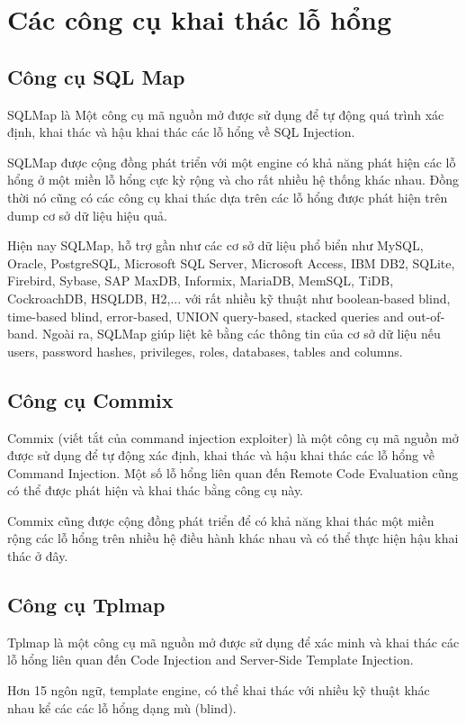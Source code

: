 \documentclass[./../main.tex]{subfiles}
\begin{document}
\section{Các công cụ khai thác lỗ hổng}

\subsection{Công cụ SQL Map}
SQLMap là Một công cụ mã nguồn mở được sử dụng để tự động quá trình xác
định, khai thác và hậu khai thác các lỗ hổng về SQL Injection.

SQLMap được cộng đồng phát triển với một engine có khả năng phát hiện các
lỗ hổng ở một miền lỗ hổng cực kỳ rộng và cho rất nhiều hệ thống khác nhau.
Đồng thời nó cũng có các công cụ khai thác dựa trên các lỗ hổng được phát
hiện trên dump cơ sở dữ liệu hiệu quả.

Hiện nay SQLMap, hỗ trợ gần như các cơ sở dữ liệu phổ biển như MySQL,
Oracle, PostgreSQL, Microsoft SQL Server, Microsoft Access, IBM DB2,
SQLite, Firebird, Sybase, SAP MaxDB, Informix, MariaDB, MemSQL, TiDB,
CockroachDB, HSQLDB, H2,... với rất nhiều kỹ thuật như boolean-based blind,
time-based blind, error-based, UNION query-based, stacked queries and
out-of-band. Ngoài ra, SQLMap giúp liệt kê bằng các thông tin của cơ
sở dữ liệu nếu users, password hashes, privileges, roles, databases,
tables and columns.

\subsection{Công cụ Commix}
Commix (viết tắt của command injection exploiter) là một công cụ mã nguồn
mở được sử dụng để tự động xác định, khai thác và hậu khai thác các lỗ
hổng về Command Injection. Một số lỗ hổng liên quan đến
Remote Code Evaluation cũng có thể được phát hiện và khai thác bằng công
cụ này.

Commix cũng được cộng đồng phát triển để có khả năng khai
thác một miền rộng các lỗ hổng trên nhiều hệ điều hành khác nhau
và có thể thực hiện hậu khai thác ở đây.
\subsection{Công cụ Tplmap}
Tplmap là một công cụ mã nguồn mở được sử dụng để xác minh và khai
thác các lỗ hổng liên quan đến Code Injection and Server-Side Template
Injection.


Hơn 15 ngôn ngữ, template engine, có thể khai thác với nhiều kỹ thuật
khác nhau kể các các lỗ hổng dạng mù (blind).
\end{document}
